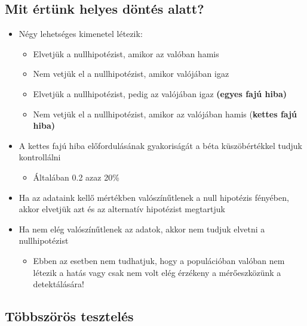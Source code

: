\documentclass[
  letterpaper,
  DIV=11,
  numbers=noendperiod]{scrreprt}
\providecommand{\tightlist}{%
  \setlength{\itemsep}{0pt}\setlength{\parskip}{0pt}}\usepackage{longtable,booktabs,array}
\begin{document}
\hypertarget{mit-uxe9rtuxfcnk-helyes-duxf6ntuxe9s-alatt}{%
\subsection{Mit értünk helyes döntés
alatt?}\label{mit-uxe9rtuxfcnk-helyes-duxf6ntuxe9s-alatt}}

\begin{itemize}
\item
  Négy lehetséges kimenetel létezik:

  \begin{itemize}
  \item
    Elvetjük a nullhipotézist, amikor az valóban hamis
  \item
    Nem vetjük el a nullhipotézist, amikor valójában igaz
  \item
    Elvetjük a nullhipotézist, pedig az valójában igaz \textbf{(egyes
    fajú hiba)}
  \item
    Nem vetjük el a nullhipotézist, amikor az valójában hamis
    (\textbf{kettes fajú hiba)}
  \end{itemize}
\end{itemize}

\begin{itemize}
\item
  A kettes fajú hiba előfordulásának gyakoriságát a béta küszöbértékkel
  tudjuk kontrollálni

  \begin{itemize}
  \tightlist
  \item
    Általában 0.2 azaz 20\%
  \end{itemize}
\item
  Ha az adataink kellő mértékben valószínűtlenek a null hipotézis
  fényében, akkor elvetjük azt és az alternatív hipotézist megtartjuk
\item
  Ha nem elég valószínűtlenek az adatok, akkor nem tudjuk elvetni a
  nullhipotézist

  \begin{itemize}
  \tightlist
  \item
    Ebben az esetben nem tudhatjuk, hogy a populációban valóban nem
    létezik a hatás vagy csak nem volt elég érzékeny a mérőeszközünk a
    detektálására!
  \end{itemize}
\end{itemize}

\hypertarget{tuxf6bbszuxf6ruxf6s-teszteluxe9s}{%
\subsection{Többszörös
tesztelés}\label{tuxf6bbszuxf6ruxf6s-teszteluxe9s}}
\end{document}
